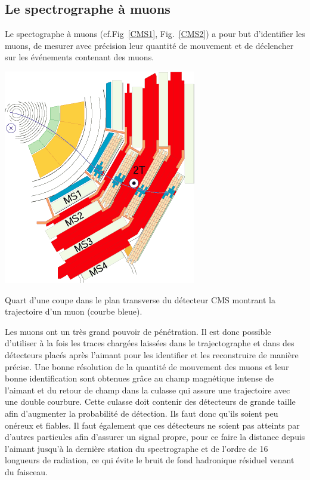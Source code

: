 \subsection{Le spectrographe à muons}
\label{RPCPRE}
Le spectographe à muons (cf.Fig~\ref{CMS1}, Fig.~\ref{CMS2}) a pour but d'identifier les muons, de mesurer avec précision leur quantité de mouvement et de déclencher sur les événements contenant des muons.
\marginpar
{
	\centering
	\includegraphics[width=\marginparwidth]{CMS/MUON.png}
	\captionsetup{type=figure}\caption{Quart d'une coupe dans le plan transverse du détecteur CMS montrant la trajectoire d'un muon (courbe bleue).}
	\label{MUON}
} Les muons ont un très grand pouvoir de pénétration. Il est donc possible d'utiliser à la fois les traces chargées laissées dans le trajectographe et dans des détecteurs placés après l'aimant pour les identifier et les reconstruire de manière précise. Une bonne résolution de la quantité de mouvement des muons et leur bonne identification sont obtenues grâce au champ magnétique intense de l'aimant et du retour de champ dans la culasse qui assure une trajectoire avec une double courbure. Cette culasse doit contenir des détecteurs de grande taille afin d'augmenter la probabilité de détection. Ils faut donc qu'ils soient peu onéreux et fiables. Il faut également que ces détecteurs ne soient pas atteints par d'autres particules afin d'assurer un signal propre, pour ce faire la distance depuis l'aimant jusqu'à la dernière station du spectrographe et de l'ordre de \num{16} longueurs de radiation, ce qui évite le bruit de fond hadronique résiduel venant du faisceau.

